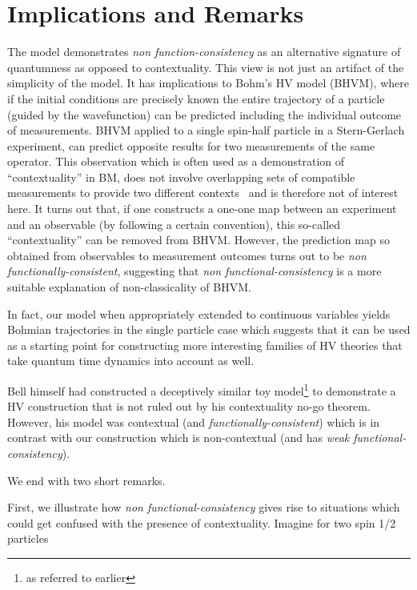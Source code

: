 \documentclass[doublecol,british]{epl2}
\theoremstyle{plain}
\theoremstyle{plain}
\theoremstyle{definition}
\theoremstyle{remark}
\theoremstyle{remark}
\theoremstyle{remark}
\theoremstyle{plain}
\theoremstyle{plain}
\theoremstyle{plain}
\theoremstyle{definition}
\theoremstyle{definition}
\begin{document}
\section{Implications and Remarks}
{  
The model demonstrates \emph{non function-consistency} as an alternative signature of quantumness as opposed to contextuality. This view is not just an artifact of the simplicity of the model. 
It }has implications to Bohm's HV
model (BHVM), where if the initial conditions are
precisely known the entire trajectory of a
particle (guided by the wavefunction) can be
predicted including the individual outcome of
measurements.  BHVM applied to a single spin-half
particle in a Stern-Gerlach experiment, can
predict opposite results for two measurements of
the same operator.  This observation which is
often used as a demonstration of ``contextuality''
in BM, does not involve  overlapping sets of
compatible measurements to provide two different
contexts~\cite{HardyCntxBM} {and is therefore not of
interest here.}  It turns out that,
if one constructs  a one-one map between an
experiment and an observable (by following a
certain convention), this so-called ``contextuality''
can be removed from BHVM.  However, the prediction
map so obtained from observables to measurement
outcomes turns out to be \emph{non functionally-consistent},
suggesting that \emph{non functional-consistency} is a more
suitable explanation of non-classicality
of BHVM.
{ In fact, our model when appropriately extended
to continuous variables yields Bohmian trajectories in the
single particle  case which suggests that it can be used as
a starting point for constructing more interesting families
of HV theories that take quantum time dynamics into account
as well.

Bell himself had constructed a deceptively similar toy
model\footnote{as referred to earlier} to demonstrate a HV
construction that is not ruled out by his contextuality
no-go theorem. However, his model was contextual (and
\emph{functionally-consistent}) which is in contrast with our
construction which is non-contextual (and has \emph{weak
functional-consistency}).


We end with two short remarks.} First, we illustrate
how \emph{non functional-consistency} gives rise to situations which
could get confused with the presence of contextuality.
Imagine for two spin 1/2 particles
\end{document}
